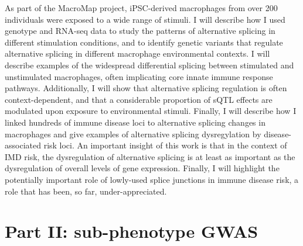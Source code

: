 As part of the MacroMap project, iPSC-derived macrophages from over 200 individuals were exposed to a wide range of stimuli. I will describe how I used genotype and RNA-seq data to study the patterns of alternative splicing in different stimulation conditions, and to identify genetic variants that regulate alternative splicing in different macrophage environmental contexts. I will describe examples of the widespread differential splicing between stimulated and unstimulated macrophages, often implicating core innate immune response pathways. Additionally, I will show that alternative splicing regulation is often context-dependent, and that a considerable proportion of sQTL effects are modulated upon exposure to environmental stimuli. Finally, I will describe how I linked hundreds of immune disease loci to alternative splicing changes in macrophages and give examples of alternative splicing dysregylation by disease-associated risk loci. An important insight of this work is that in the context of IMD risk, the dysregulation of alternative splicing is at least as important as the dysregulation of overall levels of gene expression. Finally, I will highlight the potentially important role of lowly-used splice junctions in immune disease risk, a role that has been, so far, under-appreciated.

\section{Part II: sub-phenotype GWAS}
